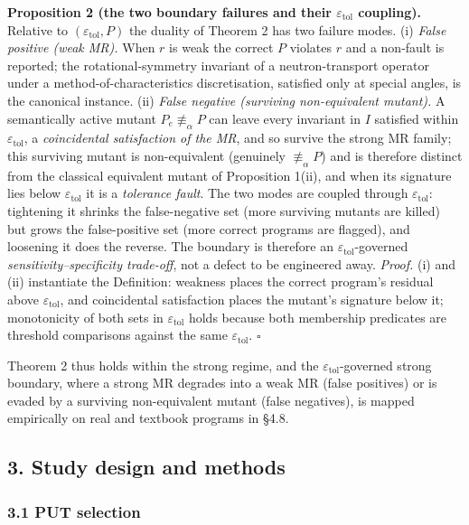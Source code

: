 \documentclass[review,12pt,authoryear]{elsarticle}
\begin{document}
\textbf{Proposition 2 (the two boundary failures and their
$\varepsilon_{\mathrm{tol}}$ coupling).} Relative to
$(\varepsilon_{\mathrm{tol}}, P)$ the duality of Theorem 2 has two
failure modes. (i) \emph{False positive (weak MR).} When $r$ is weak the
correct $P$ violates $r$ and a non-fault is reported; the
rotational-symmetry invariant of a neutron-transport operator under a
method-of-characteristics discretisation, satisfied only at special
angles, is the canonical instance. (ii) \emph{False negative (surviving
non-equivalent mutant).} A semantically active mutant
$P_e \not\equiv_\alpha P$ can leave every invariant in $I$ satisfied
within $\varepsilon_{\mathrm{tol}}$, a \emph{coincidental satisfaction
of the MR}, and so survive the strong MR family; this surviving mutant
is non-equivalent (genuinely $\not\equiv_\alpha P$) and is therefore
distinct from the classical equivalent mutant of Proposition 1(ii), and
when its signature lies below $\varepsilon_{\mathrm{tol}}$ it is a
\emph{tolerance fault}. The two modes are coupled through
$\varepsilon_{\mathrm{tol}}$: tightening it shrinks the false-negative
set (more surviving mutants are killed) but grows the false-positive set
(more correct programs are flagged), and loosening it does the reverse.
The boundary is therefore an $\varepsilon_{\mathrm{tol}}$-governed
\emph{sensitivity--specificity trade-off}, not a defect to be engineered
away. \emph{Proof.} (i) and (ii) instantiate the Definition: weakness
places the correct program's residual above $\varepsilon_{\mathrm{tol}}$,
and coincidental satisfaction places the mutant's signature below it;
monotonicity of both sets in $\varepsilon_{\mathrm{tol}}$ holds because
both membership predicates are threshold comparisons against the same
$\varepsilon_{\mathrm{tol}}$. $\square$

Theorem 2 thus holds within the strong regime, and the
$\varepsilon_{\mathrm{tol}}$-governed strong boundary, where a strong
MR degrades into a weak MR (false positives) or is evaded by a surviving
non-equivalent mutant (false negatives), is mapped empirically on real
and textbook programs in §4.8.


\subsection{3. Study design and methods}\label{experimental-subjects-and-operator-framework}

\subsubsection{3.1 PUT selection}\label{put-selection-12-puts-4-classes}
\end{document}
